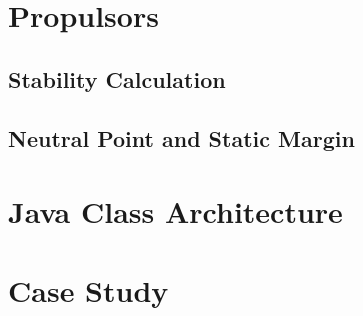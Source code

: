 \section{Propulsors}


\subsection{Stability Calculation}
\subsection{Neutral Point and Static Margin}





\section{Java Class Architecture}
 
\section{Case Study}